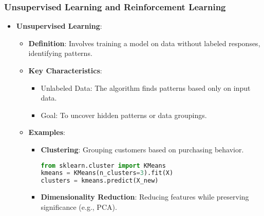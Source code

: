\documentclass[aspectratio=169]{beamer}
\begin{document}
\begin{frame}[fragile]
    \frametitle{Unsupervised Learning and Reinforcement Learning}
    \begin{itemize}
        \item \textbf{Unsupervised Learning}:
            \begin{itemize}
                \item \textbf{Definition}: Involves training a model on data without labeled responses, identifying patterns.
                \item \textbf{Key Characteristics}:
                    \begin{itemize}
                        \item Unlabeled Data: The algorithm finds patterns based only on input data.
                        \item Goal: To uncover hidden patterns or data groupings.
                    \end{itemize}
                \item \textbf{Examples}:
                    \begin{itemize}
                        \item \textbf{Clustering}: Grouping customers based on purchasing behavior.
                        \begin{lstlisting}[language=Python]
from sklearn.cluster import KMeans
kmeans = KMeans(n_clusters=3).fit(X)
clusters = kmeans.predict(X_new)
                        \end{lstlisting}
                        \item \textbf{Dimensionality Reduction}: Reducing features while preserving significance (e.g., PCA).
                    \end{itemize}
            \end{itemize}
        

\end{itemize}
\end{frame}
\end{document}
